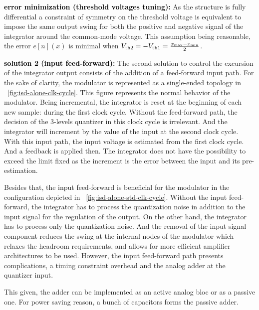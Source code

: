 \textbf{\textcolor{black}{error minimization (threshold voltages tuning):}}
As the structure is fully differential a constraint of symmetry on the threshold voltage is equivalent to impose the same output swing for both the positive and negative signal of the integrator around the common-mode voltage. This assumption being reasonable, the error \(e[n](x) \) is minimal when \(V_{\rm th2}=-V_{\rm th1}=\frac{x_{\max}-x_{\min}}{2} \).

\textbf{\textcolor{black}{solution 2 (input feed-forward):}}
The second solution to control the excursion of the integrator output consists of the addition of a feed-forward input path. For the sake of clarity, the modulator is represented as a single-ended topology in \figurename~\ref{fig:isd-alone-clk-cycle}. This figure represents the normal behavior of the modulator. Being incremental, the integrator is reset at the beginning of each new sample: during the first clock cycle. Without the feed-forward path, the decision of the 3-levels quantizer in this clock cycle is irrelevant. And the integrator will increment by the value of the input at the second clock cycle. With this input path, the input voltage is estimated from the first clock cycle. And a feedback is applied then. The integrator does not have the possibility to exceed the limit fixed as the increment is the error between the input and its pre-estimation.

Besides that, the input feed-forward is beneficial for the modulator in the configuration depicted in \figurename~\ref{fig:isd-alone-std-clk-cycle}. Without the input feed-forward, the integrator has to process the quantization noise in addition to the input signal for the regulation of the output. On the other hand, the integrator has to process only the quantization noise. And the removal of the input signal component reduces the swing at the internal nodes of the modulator which relaxes the headroom requirements, and allows for more efficient amplifier architectures to be used. However, the input feed-forward path presents complications, a timing constraint overhead and the analog adder at the quantizer input.

This given, the adder can be implemented as an active analog bloc or as a passive one. For power saving reason, a bunch of capacitors forms the passive adder.

